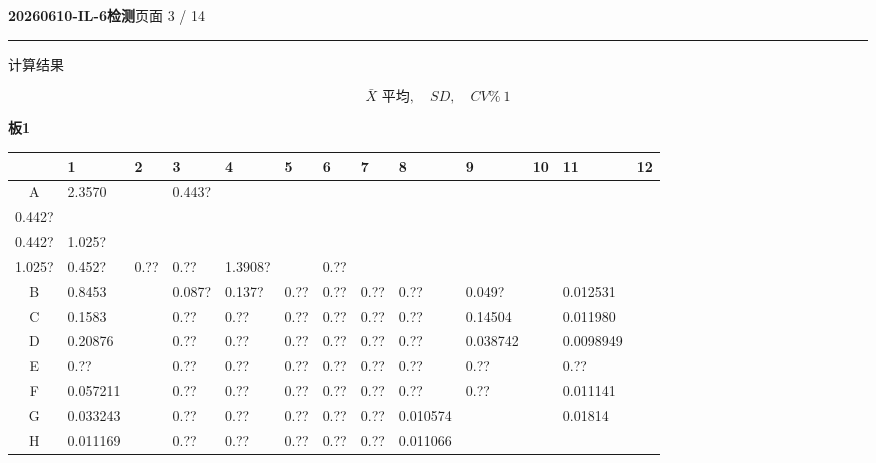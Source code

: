 \documentclass[UTF8,10pt,a4paper,fontset=fandol]{ctexart}
\begin{document}
\newpage

\begin{center}
\textbf{20260610-IL-6检测}\hfill 页面 3 / 14
\end{center}
\hrule

\vspace{0.3em}
计算结果

\[
\bar{X}\text{ 平均},\quad SD,\quad CV\%~1
\]

\textbf{板1}

\begin{center}
\scriptsize
\begin{tabular}{c|*{12}{p{0.62cm}|}}
 & 1 & 2 & 3 & 4 & 5 & 6 & 7 & 8 & 9 & 10 & 11 & 12\\ \hline
A &
\raggedright 2.3570 &
&
\raggedright 0.443?\\0.442?\\0.442? &
\raggedright 1.025?\\1.025? &
\raggedright 0.452? &
\raggedright 0.?? &
\raggedright 0.?? &
\raggedright 1.3908? &
&
\raggedright 0.?? &
\\ \hline
B &
\raggedright 0.8453 &
&
\raggedright 0.087? &
\raggedright 0.137? &
\raggedright 0.?? &
\raggedright 0.?? &
\raggedright 0.?? &
\raggedright 0.?? &
\raggedright 0.049? &
&
\raggedright 0.012531 &
\\ \hline
C &
\raggedright 0.1583 &
&
\raggedright 0.?? &
\raggedright 0.?? &
\raggedright 0.?? &
\raggedright 0.?? &
\raggedright 0.?? &
\raggedright 0.?? &
\raggedright 0.14504 &
&
\raggedright 0.011980 &
\\ \hline
D &
\raggedright 0.20876 &
&
\raggedright 0.?? &
\raggedright 0.?? &
\raggedright 0.?? &
\raggedright 0.?? &
\raggedright 0.?? &
\raggedright 0.?? &
\raggedright 0.038742 &
&
\raggedright 0.0098949 &
\\ \hline
E &
\raggedright 0.?? &
&
\raggedright 0.?? &
\raggedright 0.?? &
\raggedright 0.?? &
\raggedright 0.?? &
\raggedright 0.?? &
\raggedright 0.?? &
\raggedright 0.?? &
&
\raggedright 0.?? &
\\ \hline
F &
\raggedright 0.057211 &
&
\raggedright 0.?? &
\raggedright 0.?? &
\raggedright 0.?? &
\raggedright 0.?? &
\raggedright 0.?? &
\raggedright 0.?? &
\raggedright 0.?? &
&
\raggedright 0.011141 &
\\ \hline
G &
\raggedright 0.033243 &
&
\raggedright 0.?? &
\raggedright 0.?? &
\raggedright 0.?? &
\raggedright 0.?? &
\raggedright 0.?? &
\raggedright 0.010574 &
&
&
\raggedright 0.01814 &
\\ \hline
H &
\raggedright 0.011169 &
&
\raggedright 0.?? &
\raggedright 0.?? &
\raggedright 0.?? &
\raggedright 0.?? &
\raggedright 0.?? &
\raggedright 0.011066 &
&
&
&
\\ \hline
\end{tabular}
\end{center}
\end{document}
